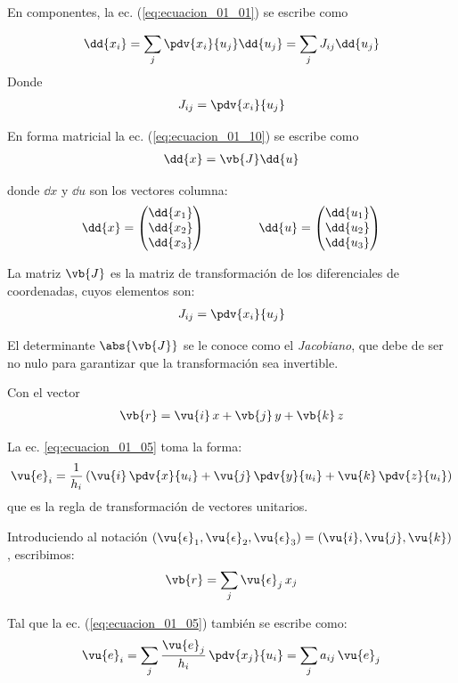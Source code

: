 En componentes, la ec. (\ref{eq:ecuacion_01_01}) se escribe como

\begin{align}
\dd{x_{i}} = \sum_{j} \pdv{x_{i}}{u_{j}} \dd{u_{j}} = \sum_{j} J_{ij} \dd{u_{j}}
\label{eq:ecuacion_01_10}
\end{align}
Donde
\begin{align}
J_{ij} = \pdv{x_{i}}{u_{j}}
\label{eq:ecuacion_01_11}
\end{align}

En forma matricial la ec. (\ref{eq:ecuacion_01_10}) se escribe como
\begin{align}
\dd{x} = \vb{J} \dd{u}
\end{align}

donde $\dd{x}$ y $\dd{u}$ son los vectores columna:
\begin{align*}
\dd{x} = \begin{pmatrix}
\dd{x_{1}} \\
\dd{x_{2}} \\
\dd{x_{3}} \\
\end{pmatrix}
\hspace{1.5cm}
\dd{u} = \begin{pmatrix}
\dd{u_{1}} \\
\dd{u_{2}} \\
\dd{u_{3}} \\
\end{pmatrix}
\end{align*}

La matriz $\vb{J}$ es la matriz de transformación de los diferenciales de coordenadas, cuyos elementos son:
\begin{align*}
J_{ij} = \pdv{x_{i}}{u_{j}}
\end{align*}

El determinante $\abs{\vb{J}}$ se le conoce como el \emph{Jacobiano}, que debe de ser no nulo para garantizar que la transformación sea invertible.

Con el vector
\begin{align*}
\vb{r} = \vu{i} \, x + \vb{j} \, y + \vb{k} \,z
\end{align*}

La ec. \ref{eq:ecuacion_01_05} toma la forma:
\begin{align}
\vu{e}_{i} = \dfrac{1}{h_{i}} \left( \vu{i} \, \pdv{x}{u_{i}} + \vu{j} \, \pdv{y}{u_{i}} + \vu{k} \, \pdv{z}{u_{i}} \right)
\label{eq:ecuacion_01_12}
\end{align}
que es la regla de transformación de vectores unitarios.
\par
Introduciendo al notación $(\vu{\epsilon}_{1}, \vu{\epsilon}_{2}, \vu{\epsilon}_{3}) = (\vu{i}, \vu{j}, \vu{k})$, escribimos:
\begin{align*}
\vb{r} = \sum_{j} \vu{\epsilon}_{j} \, x_{j}
\end{align*}
\par
Tal que la ec. (\ref{eq:ecuacion_01_05}) también se escribe como:
\begin{align}
\vu{e}_{i} = \sum_{j} \dfrac{\vu{e}_{j}}{h_{i}} \, \pdv{x_{j}}{u_{i}} = \sum_{j} a_{ij} \, \vu{e}_{j}
\label{eq:ecuacion_01_13}
\end{align}

